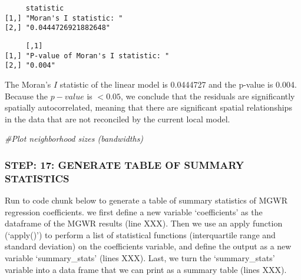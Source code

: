 \documentclass[
  12pt,
]{article}
\newenvironment{Shaded}{\begin{snugshade}}{\end{snugshade}}
\newcommand{\CommentTok}[1]{\textcolor[rgb]{0.56,0.35,0.01}{\textit{#1}}}
\newcommand{\FunctionTok}[1]{\textcolor[rgb]{0.13,0.29,0.53}{\textbf{#1}}}
\newcommand{\NormalTok}[1]{#1}
\newcommand{\SpecialCharTok}[1]{\textcolor[rgb]{0.81,0.36,0.00}{\textbf{#1}}}
\newcommand{\StringTok}[1]{\textcolor[rgb]{0.31,0.60,0.02}{#1}}
\begin{document}
\begin{verbatim}
     statistic              
[1,] "Moran's I statistic: "
[2,] "0.0444726921882648"   
\end{verbatim}

\begin{Shaded}
\end{Shaded}

\begin{verbatim}
     [,1]                              
[1,] "P-value of Moran's I statistic: "
[2,] "0.004"                           
\end{verbatim}

The Moran's \(I\) statistic of the linear model is 0.0444727 and the
p-value is 0.004. Because the \(p-value\) is \(<0.05\), we conclude that
the residuals are significantly spatially autocorrelated, meaning that
there are significant spatial relationships in the data that are not
reconciled by the current local model.

\begin{Shaded}
\begin{Highlighting}[]
\CommentTok{\#Plot neighborhood sizes (bandwidths)}
\end{Highlighting}
\end{Shaded}

\hypertarget{step-17-generate-table-of-summary-statistics}{%
\subsubsection{STEP: 17: GENERATE TABLE OF SUMMARY
STATISTICS}\label{step-17-generate-table-of-summary-statistics}}

Run to code chunk below to generate a table of summary statistics of
MGWR regression coefficients. we first define a new variable
`coefficients' as the dataframe of the MGWR results (line XXX). Then we
use an apply function (`apply()') to perform a list of statistical
functions (interquartile range and standard deviation) on the
coefficients variable, and define the output as a new variable
`summary\_stats' (lines XXX). Last, we turn the `summary\_stats'
variable into a data frame that we can print as a summary table (lines
XXX).
\end{document}
